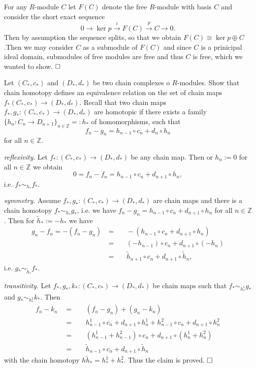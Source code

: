 \documentclass[11pt]{book}
\numberwithin{dummy}{section}
\theoremstyle{nonumberbreak}
\newenvironment{sol}[1][]{\ifthenelse{\equal{#1}{}}{\solution}{\solution[#1]}\rm}{\endsolution}
\newenvironment{prob}[1][]{\ifthenelse{\equal{#1}{}}{\problem}{\problem[#1]}\rm}{\endproblem}
\newcommand{\la}{\longrightarrow}
\newcommand{\Z}{\mathbb{Z}}
\begin{document}
\begin{spacing}{1.4}
\begin{prob}
\begin{sol}
\begin{compactenum}
\item For any $R$-module $C$ let $F(C)$ denote the free $R$-module with basis $C$ and consider the short exact sequence
$$0 \la \ker p \overset{i}{\la} F(C) \overset{p}{\la} C \la 0.$$
Then by assumption the sequence splits, so that we obtain $F(C) \cong \ker p \oplus C$.Then we may consider $C$ as a submodule of $F(C)$ and since $C$ is a prinicipal ideal domain, submodules of free modules are free and thus $C$ is free, which we wanted to show. $\hfill \Box$
\end{compactenum}

\end{sol}

\end{prob}

\begin{prob}    %
Let $(C_*,c_*)$ and $(D_*,d_*)$ be two chain complexes o $R$-modules. Show that chain homotopy defines an equivalence relation on the set of chain maps $f_* (C_*,c_*) \la (D_*,d_*)$.
\begin{sol}
Recall that two chain maps $f_*, g_*: (C_*,c_*) \la (D_*,d_*)$ are homotopic if there exists a family $\{h_n: C_n \la D_{n+1}\}_{n \in \Z}=:h_*$ of homomorphisms, such that 
$$f_n - g_n = h_{n-1} \circ c_n + d_n \circ h_n$$
for all $n \in \Z$.
\begin{compactitem}
\item \textit{reflexivity.} Let $f_*: (C_*,c_*) \la (D_*,d_*)$ be any chain map. Then or $h_n:=0$ for all $n \in \Z$ we obtain 
$$0=f_n-f_n= h_{n-1} \circ c_n + d_{n+1}\circ h_n,$$
i.e. $f_* \sim_{h_*} f_*$.
\item \textit{symmetry.} Assume $f_*, g_*: (C_*,c_*) \la (D_*,d_*)$ are chain maps and there is a chain homotopy $f_* \sim_{h_*} g_*$, i.e. we have $f_n - g_n = h_{n-1} \circ c_n + d_{n+1} \circ h_n$ for all $n\in \Z$. Then for $\tilde{h}_* := -h_*$ we have
\begin{alignat*}{5} g_n - f_n = -(f_n - g_n) \ &=&& \  -(h_{n-1} \circ c_n + d_{n+1} \circ h_n) \\
&=&& \ (-h_{n-1}) \circ c_n  + d_{n+1} \circ (-h_n)\\
& =&& \ \tilde{h}_{n+1} \circ c_n + d_{n+1} \circ \tilde{h}_n,
\end{alignat*}
i.e. $g_* \sim_{\tilde{h}_*} f_*$. 
\item \textit{transitivity.} Let $f_*,g_*,k_*: (C_*,c_*) \la (D_*,d_*)$ be chain maps such that $f_* \sim_{h_*^1} g_*$ and $g_* \sim_{h_*^2} k_*$. Then 
\begin{alignat*}{5}
f_n - k_n  \ \ &=&& \ \ (f_n - g_n) +(g_n - k_n) \\
&=&& \ \ h_{n-1}^1 \circ c_n + d_{n+1} \circ h_n^1 + h_{n-1}^2 \circ c_n + d_{n+1} \circ h_n^2 \\
&=&& \ \ (h_{n-1}^1 + h_{n-1}^2) \circ c_n + d_{n+1} \circ (h_n^1 + h_n^2) \\
&=&& \ \ \tilde{h}_{n-1} \circ c_n + d_{n+1}\circ \tilde{h}_n
\end{alignat*}
with the chain homotopy $h\tilde{h}_* = h_*^1 + h_*^2$. Thus the claim is proved. $\hfill \Box$



\end{compactitem}
\end{sol}
\end{prob}
\end{spacing}
\end{document}
